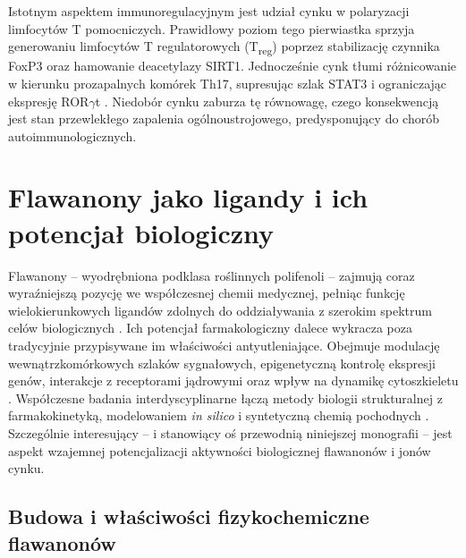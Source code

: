 \documentclass[12pt,a4paper]{article}
\begin{document}
Istotnym aspektem immunoregulacyjnym jest udział cynku w polaryzacji limfocytów T pomocniczych. Prawidłowy poziom tego pierwiastka sprzyja generowaniu limfocytów T regulatorowych (T\textsubscript{reg}) poprzez stabilizację czynnika FoxP3 oraz hamowanie deacetylazy SIRT1. Jednocześnie cynk tłumi różnicowanie w kierunku prozapalnych komórek Th17, supresując szlak STAT3 i ograniczając ekspresję ROR\(\gamma\)t \cite{kimlee2021}. Niedobór cynku zaburza tę równowagę, czego konsekwencją jest stan przewlekłego zapalenia ogólnoustrojowego, predysponujący do chorób autoimmunologicznych.



\section{Flawanony jako ligandy i ich potencjał biologiczny}

Flawanony -- wyodrębniona podklasa roślinnych polifenoli -- zajmują coraz wyraźniejszą pozycję we współczesnej chemii medycznej, pełniąc funkcję wielokierunkowych ligandów zdolnych do oddziaływania z szerokim spektrum celów biologicznych \cite{williamson2018}. Ich potencjał farmakologiczny dalece wykracza poza tradycyjnie przypisywane im właściwości antyutleniające. Obejmuje modulację wewnątrzkomórkowych szlaków sygnałowych, epigenetyczną kontrolę ekspresji genów, interakcje z receptorami jądrowymi oraz wpływ na dynamikę cytoszkieletu \cite{kopustinskiene2020}. Współczesne badania interdyscyplinarne łączą metody biologii strukturalnej z farmakokinetyką, modelowaniem \textit{in silico} i syntetyczną chemią pochodnych \cite{santos2020}. Szczególnie interesujący -- i stanowiący oś przewodnią niniejszej monografii -- jest aspekt wzajemnej potencjalizacji aktywności biologicznej flawanonów i jonów cynku.

\subsection{Budowa i właściwości fizykochemiczne flawanonów}
\end{document}
